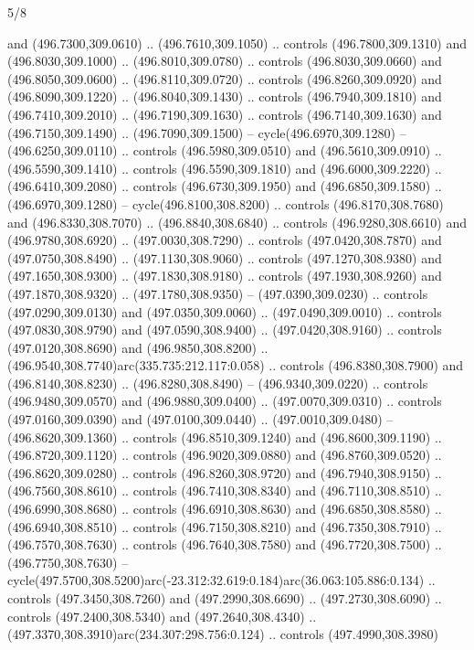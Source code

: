 \begin{flagdescription}{5/8}
\begin{scope}[xshift=0.5\flaglength,yshift=0.5\flagwidth,scale=\flagwidth/475.63]
\begin{scope}[y=0.8pt, x=0.8pt, yscale=-1, xscale=1,shift={(-450,-300)}]
\begin{scope}[cm={{1.0,0.0,0.0,1.0,(-0.0002,0.12556)}},cm={{1.0,0.0,0.0,1.0,(0.00179,0.0)}}]
\begin{scope}[cm={{1.11592,0.0,0.0,1.11592,(-106.89933,-41.77764)}}]
\begin{scope}[draw=black,fill=cfff]
\begin{scope}[fill=black]
  and (496.7300,309.0610) .. (496.7610,309.1050) .. controls (496.7800,309.1310)
  and (496.8030,309.1000) .. (496.8010,309.0780) .. controls (496.8030,309.0660)
  and (496.8050,309.0600) .. (496.8110,309.0720) .. controls (496.8260,309.0920)
  and (496.8090,309.1220) .. (496.8040,309.1430) .. controls (496.7940,309.1810)
  and (496.7410,309.2010) .. (496.7190,309.1630) .. controls (496.7140,309.1630)
  and (496.7150,309.1490) .. (496.7090,309.1500) -- cycle(496.6970,309.1280) --
  (496.6250,309.0110) .. controls (496.5980,309.0510) and (496.5610,309.0910) ..
  (496.5590,309.1410) .. controls (496.5590,309.1810) and (496.6000,309.2220) ..
  (496.6410,309.2080) .. controls (496.6730,309.1950) and (496.6850,309.1580) ..
  (496.6970,309.1280) -- cycle(496.8100,308.8200) .. controls
  (496.8170,308.7680) and (496.8330,308.7070) .. (496.8840,308.6840) .. controls
  (496.9280,308.6610) and (496.9780,308.6920) .. (497.0030,308.7290) .. controls
  (497.0420,308.7870) and (497.0750,308.8490) .. (497.1130,308.9060) .. controls
  (497.1270,308.9380) and (497.1650,308.9300) .. (497.1830,308.9180) .. controls
  (497.1930,308.9260) and (497.1870,308.9320) .. (497.1780,308.9350) --
  (497.0390,309.0230) .. controls (497.0290,309.0130) and (497.0350,309.0060) ..
  (497.0490,309.0010) .. controls (497.0830,308.9790) and (497.0590,308.9400) ..
  (497.0420,308.9160) .. controls (497.0120,308.8690) and (496.9850,308.8200) ..
  (496.9540,308.7740)arc(335.735:212.117:0.058) .. controls (496.8380,308.7900)
  and (496.8140,308.8230) .. (496.8280,308.8490) -- (496.9340,309.0220) ..
  controls (496.9480,309.0570) and (496.9880,309.0400) .. (497.0070,309.0310) ..
  controls (497.0160,309.0390) and (497.0100,309.0440) .. (497.0010,309.0480) --
  (496.8620,309.1360) .. controls (496.8510,309.1240) and (496.8600,309.1190) ..
  (496.8720,309.1120) .. controls (496.9020,309.0880) and (496.8760,309.0520) ..
  (496.8620,309.0280) .. controls (496.8260,308.9720) and (496.7940,308.9150) ..
  (496.7560,308.8610) .. controls (496.7410,308.8340) and (496.7110,308.8510) ..
  (496.6990,308.8680) .. controls (496.6910,308.8630) and (496.6850,308.8580) ..
  (496.6940,308.8510) .. controls (496.7150,308.8210) and (496.7350,308.7910) ..
  (496.7570,308.7630) .. controls (496.7640,308.7580) and (496.7720,308.7500) ..
  (496.7750,308.7630) --
  cycle(497.5700,308.5200)arc(-23.312:32.619:0.184)arc(36.063:105.886:0.134) ..
  controls (497.3450,308.7260) and (497.2990,308.6690) .. (497.2730,308.6090) ..
  controls (497.2400,308.5340) and (497.2640,308.4340) ..
  (497.3370,308.3910)arc(234.307:298.756:0.124) .. controls (497.4990,308.3980)

\end{scope}
\end{scope}
\end{scope}
\end{scope}
\end{scope}
\end{scope}
\end{flagdescription}
